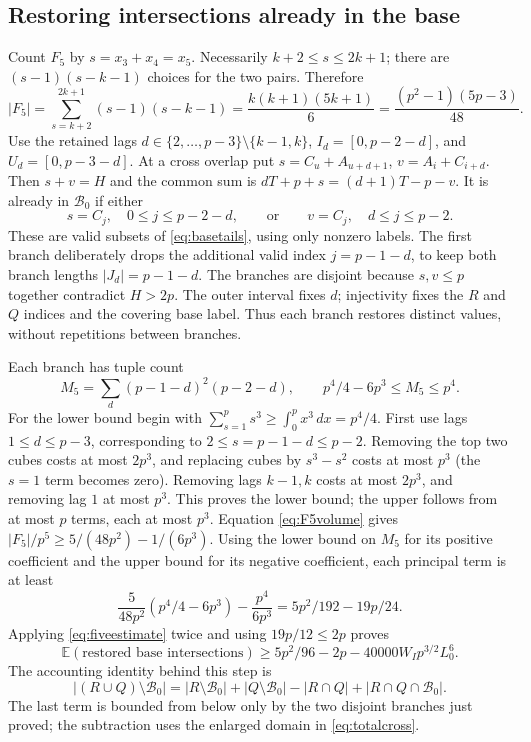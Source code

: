 \documentclass[10pt]{amsart}
\theoremstyle{remark}
\newcommand{\E}{\mathbb E}
\newcommand{\Bset}{\mathcal B}
\begin{document}
\subsection{Restoring intersections already in the base}
Count $F_5$ by $s=x_3+x_4=x_5$. Necessarily $k+2\le s\le2k+1$;
there are $(s-1)(s-k-1)$ choices for the two pairs. Therefore
\begin{equation}\label{eq:F5volume}
 |F_5|=\sum_{s=k+2}^{2k+1}(s-1)(s-k-1)
 =\frac{k(k+1)(5k+1)}6=\frac{(p^2-1)(5p-3)}{48}.
\end{equation}
Use the retained lags $d\in\{2,\ldots,p-3\}\setminus\{k-1,k\}$,
$I_d=[0,p-2-d]$, and $U_d=[0,p-3-d]$.
At a cross overlap put $s=C_u+A_{u+d+1}$, $v=A_i+C_{i+d}$.
Then $s+v=H$ and the common sum is $dT+p+s=(d+1)T-p-v$.
It is already in $\Bset_0$ if either
\begin{equation}\label{eq:restorebranches}
 s=C_j,\quad 0\le j\le p-2-d,
 \qquad\text{or}\qquad
 v=C_j,\quad d\le j\le p-2.
\end{equation}
These are valid subsets of \eqref{eq:basetails}, using only nonzero
labels. The first branch deliberately drops the additional valid
index $j=p-1-d$, to keep both branch lengths $|J_d|=p-1-d$.
The branches are disjoint because $s,v\le p$ together contradict
$H>2p$. The outer interval fixes $d$; injectivity fixes the $R$ and
$Q$ indices and the covering base label. Thus each branch restores
distinct values, without repetitions between branches.

Each branch has tuple count
\begin{equation}\label{eq:M5bounds}
 M_5=\sum_d(p-1-d)^2(p-2-d),\qquad
 p^4/4-6p^3\le M_5\le p^4.
\end{equation}
For the lower bound begin with
$\sum_{s=1}^p s^3\ge\int_0^p x^3\,dx=p^4/4$.
First use lags $1\le d\le p-3$, corresponding to $2\le s=p-1-d\le p-2$.
Removing the top two cubes costs at most $2p^3$, and replacing
cubes by $s^3-s^2$ costs at most $p^3$ (the $s=1$ term becomes zero).
Removing lags $k-1,k$ costs at most $2p^3$, and removing lag $1$
at most $p^3$. This proves the lower bound; the upper follows from
at most $p$ terms, each at most $p^3$.
Equation \eqref{eq:F5volume} gives
$|F_5|/p^5\ge5/(48p^2)-1/(6p^3)$.
Using the lower bound on $M_5$ for its positive coefficient and the
upper bound for its negative coefficient, each principal term is at least
\[
 \frac5{48p^2}(p^4/4-6p^3)-\frac{p^4}{6p^3}
 =5p^2/192-19p/24.
\]
Applying \eqref{eq:fiveestimate} twice and using $19p/12\le2p$ proves
\begin{equation}\label{eq:restoration}
 \E(\text{restored base intersections})
 \ge5p^2/96-2p-40000W_Ip^{3/2}L_0^6.
\end{equation}
The accounting identity behind this step is
\[
 |(R\cup Q)\setminus\Bset_0|
 =|R\setminus\Bset_0|+|Q\setminus\Bset_0|-|R\cap Q|
  +|R\cap Q\cap\Bset_0|.
\]
The last term is bounded from below only by the two disjoint branches
just proved; the subtraction uses the enlarged domain in
\eqref{eq:totalcross}.
\end{document}
